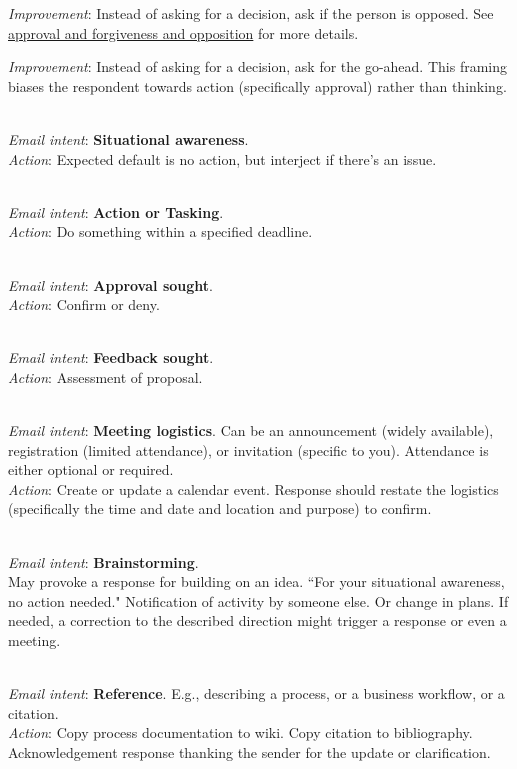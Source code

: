 \textit{Improvement}: Instead of asking for a decision, ask if the person is opposed. See 
\hyperref[sec:approval-forgiveness-opposition]{approval and forgiveness and opposition}
for more details.

\textit{Improvement}: Instead of asking for a decision, ask for the go-ahead. This framing biases the respondent towards action (specifically approval) rather than thinking. 

\ \\
\textit{Email intent}: \textbf{Situational awareness}.\\
\textit{Action}: Expected default is no action, but interject if there's an issue.

\ \\
\textit{Email intent}: \textbf{Action or Tasking}.\\
\textit{Action}: Do something within a specified deadline.

\ \\
\textit{Email intent}: \textbf{Approval sought}.\\
\textit{Action}: Confirm or deny.

\ \\
\textit{Email intent}: \textbf{Feedback sought}.\\
\textit{Action}: Assessment of proposal.

\ \\
\textit{Email intent}: \textbf{Meeting logistics}. Can be an announcement (widely available), registration (limited attendance), or invitation (specific to you). Attendance is either optional or required. \\
\textit{Action}: Create or update a calendar event.
Response should restate the logistics (specifically the time and date and location and purpose) to confirm. 

\ \\
\textit{Email intent}: \textbf{Brainstorming}.\\
May provoke a response for building on an idea.
``For your situational awareness, no action needed." Notification of activity by someone else. Or change in plans. 
If needed, a correction to the described direction might trigger a response or even a meeting.

\ \\
\textit{Email intent}: \textbf{Reference}. E.g., describing a process, or a business workflow, or a citation.\\
\textit{Action}: Copy process documentation to wiki. Copy citation to bibliography.
Acknowledgement response thanking the sender for the update or clarification.

